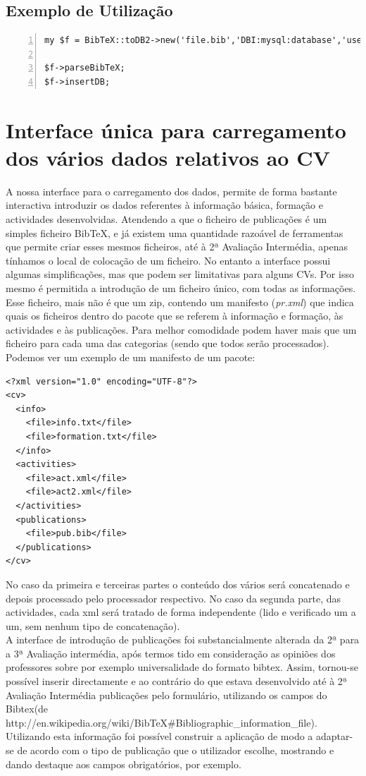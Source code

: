 \documentclass[a4paper,11pt,openright,openbib]{article}
\begin{document}
\subsection{Exemplo de Utilização}

\lstset{language=Perl}
\lstset{basicstyle=\ttfamily\footnotesize}
\lstset{commentstyle=\textit}
\lstset{breaklines=true}
\begin{lstlisting}[numbers=left]
my $f = BibTeX::toDB2->new('file.bib','DBI:mysql:database','user','pass');

$f->parseBibTeX;
$f->insertDB;
\end{lstlisting}

\section{Interface única para carregamento dos vários dados relativos ao CV}
A nossa interface para o carregamento dos dados, permite de forma bastante interactiva introduzir os dados referentes à informação básica, formação e actividades desenvolvidas. Atendendo a que o ficheiro de publicações é um simples ficheiro BibTeX, e já existem uma quantidade razoável de ferramentas que permite criar esses mesmos ficheiros, até à 2ª Avaliação Intermédia, apenas tínhamos o local de colocação de um ficheiro. No entanto a interface possui algumas simplificações, mas que podem ser limitativas para alguns CVs. Por isso mesmo é permitida a introdução de um ficheiro único, com todas as informações. Esse ficheiro, mais não é que um zip, contendo um manifesto (\emph{pr.xml}) que indica quais os ficheiros dentro do pacote que se referem à informação e formação, às actividades e às publicações. Para melhor comodidade podem haver mais que um ficheiro para cada uma das categorias (sendo que todos serão processados). Podemos ver um exemplo de um manifesto de um pacote:
\begin{verbatim}
<?xml version="1.0" encoding="UTF-8"?>
<cv>
  <info>
    <file>info.txt</file>
    <file>formation.txt</file>
  </info>
  <activities>
    <file>act.xml</file>
    <file>act2.xml</file>
  </activities>
  <publications>
    <file>pub.bib</file>
  </publications>
</cv>
\end{verbatim}
No caso da primeira e terceiras partes o conteúdo dos vários será concatenado e depois processado pelo processador respectivo. No caso da segunda parte, das actividades, cada xml será tratado de forma independente (lido e verificado um a um, sem nenhum tipo de concatenação).\\
A interface de introdução de publicações foi substancialmente alterada da 2ª para a 3ª Avaliação intermédia, após termos tido em consideração as opiniões dos professores sobre por exemplo universalidade do formato bibtex. Assim, tornou-se possível inserir directamente e ao contrário do que estava desenvolvido até à 2ª Avaliação Intermédia publicações pelo formulário, utilizando os campos do Bibtex(de http://en.wikipedia.org/wiki/BibTeX\#Bibliographic\_information\_file). Utilizando esta informação foi possível construir a aplicação de modo a adaptar-se de acordo com o tipo de publicação que o utilizador escolhe, mostrando e dando destaque aos campos obrigatórios, por exemplo.\\
\end{document}
